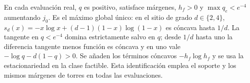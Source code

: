 En cada evaluación real, $q$ es positivo, satisface márgenes, $h_f>0$ y $\max q_e<e^{-4}$
aumentando $j_0$. Es el máximo global único: en el sitio de grado $d\in\{2,4\}$,
$s_d(x)=-x\log x+(d-1)(1-x)\log(1-x)$ es cóncava hasta $1/d$.
La tangente en $q<e^{-4}$ domina estrictamente salvo en $q$; desde $1/d$ hasta uno
la diferencia tangente menos función es cóncava y en uno vale
$-\log q-d(1-q)>0$. Se añaden los términos cóncavos $-h_f\log h_f$ y se usa
la estacionariedad en la clase factible. Esta identificación emplea el soporte y
los mismos márgenes de torres en todas las evaluaciones.
